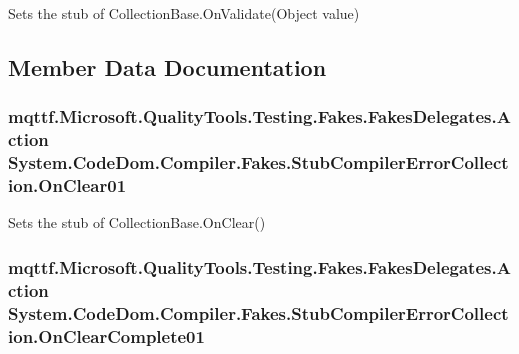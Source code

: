 Sets the stub of Collection\-Base.\-On\-Validate(\-Object value)



\subsection{Member Data Documentation}
\hypertarget{class_system_1_1_code_dom_1_1_compiler_1_1_fakes_1_1_stub_compiler_error_collection_ab559e0463a06c9d0679ab6593a896c6c}{
\subsubsection[{On\-Clear01}]{\setlength{\rightskip}{0pt plus 5cm}mqttf.\-Microsoft.\-Quality\-Tools.\-Testing.\-Fakes.\-Fakes\-Delegates.\-Action System.\-Code\-Dom.\-Compiler.\-Fakes.\-Stub\-Compiler\-Error\-Collection.\-On\-Clear01}}\label{class_system_1_1_code_dom_1_1_compiler_1_1_fakes_1_1_stub_compiler_error_collection_ab559e0463a06c9d0679ab6593a896c6c}


Sets the stub of Collection\-Base.\-On\-Clear()

\hypertarget{class_system_1_1_code_dom_1_1_compiler_1_1_fakes_1_1_stub_compiler_error_collection_a9a6a633f212c22c289a36dbaa832f9ef}{
\subsubsection[{On\-Clear\-Complete01}]{\setlength{\rightskip}{0pt plus 5cm}mqttf.\-Microsoft.\-Quality\-Tools.\-Testing.\-Fakes.\-Fakes\-Delegates.\-Action System.\-Code\-Dom.\-Compiler.\-Fakes.\-Stub\-Compiler\-Error\-Collection.\-On\-Clear\-Complete01}}\label{class_system_1_1_code_dom_1_1_compiler_1_1_fakes_1_1_stub_compiler_error_collection_a9a6a633f212c22c289a36dbaa832f9ef}


